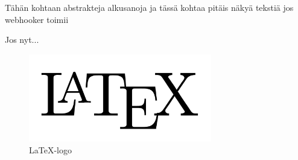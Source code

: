 \documentclass[12pt]{report} %
\begin{document}
    Tähän kohtaan abstrakteja alkusanoja ja tässä kohtaa pitäis näkyä tekstiä jos webhooker toimii

    Jos nyt...

    \begin{figure}[H] %
        \centering
        \includegraphics[width=8cm]{latex.png}
        \caption{\LaTeX -logo} %
        \label{img:myimg.jpg} %
        \end{figure}
    


    
    
    

    \printglossaries

    \appendix

    
    
\end{document}
